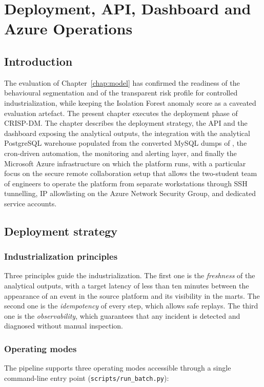 \chapter{Deployment, API, Dashboard and Azure Operations}
\label{chap:deploy}

\section{Introduction}
The evaluation of Chapter~\ref{chap:model} has confirmed the readiness of the behavioural segmentation and of the transparent risk profile for controlled industrialization, while keeping the Isolation Forest anomaly score as a caveated evaluation artefact. The present chapter executes the deployment phase of CRISP-DM. The chapter describes the deployment strategy, the API and the dashboard exposing the analytical outputs, the integration with the analytical PostgreSQL warehouse populated from the converted MySQL dumps of \hostorg, the cron-driven automation, the monitoring and alerting layer, and finally the Microsoft Azure infrastructure on which the platform runs, with a particular focus on the secure remote collaboration setup that allows the two-student team of engineers to operate the platform from separate workstations through SSH tunnelling, IP allowlisting on the Azure Network Security Group, and dedicated service accounts.

\section{Deployment strategy}

\subsection{Industrialization principles}
Three principles guide the industrialization. The first one is the \emph{freshness} of the analytical outputs, with a target latency of less than ten minutes between the appearance of an event in the source platform and its visibility in the marts. The second one is the \emph{idempotency} of every step, which allows safe replays. The third one is the \emph{observability}, which guarantees that any incident is detected and diagnosed without manual inspection.

\subsection{Operating modes}
The pipeline supports three operating modes accessible through a single command-line entry point (\texttt{scripts/run\_batch.py}):

